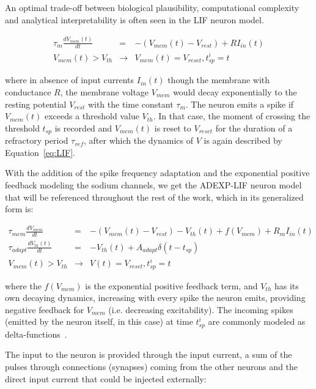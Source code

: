 An optimal trade-off between biological plausibility, computational complexity and analytical interpretability is often seen in the \ac{LIF} neuron model.

\begin{eqnarray}
    \tau_m \frac{dV_{mem}(t)}{dt} & = & - (V_{mem}(t) - V_{rest}) + RI_{in}(t) \label{eq:LIF}\\
    V_{mem}(t) > V_{th} & \rightarrow & V_{mem}(t) = V_{reset}, t^i_{sp} = t
    \label{eq:LIF_reset}
\end{eqnarray}

where in absence of input currents $I_{in}(t)$ though the membrane with conductance $R$, the membrane voltage $V_{mem}$ would decay exponentially to the resting potential $V_{rest}$ with the time constant $\tau_{m}$. The neuron emits a spike if $V_{mem}(t)$ exceeds a threshold value $V_{th}$. In that case, the moment of crossing the threshold $t_{sp}$ is recorded and $V_{mem}(t)$ is reset to $V_{reset}$ for the duration of a refractory period $\tau_{ref}$, after which the dynamics of $V$ is again described by Equation~\ref{eq:LIF}.

With the addition of the spike frequency adaptation and the exponential positive feedback modeling the sodium channels, we get the \ac{ADEXP-LIF} neuron model ~\cite{Brette_Gerstner05} that will be referenced throughout the rest of the work, which in its generalized form is:

\begin{eqnarray}
    \tau_{mem} \frac{dV_{mem}}{dt} & = & - (V_{mem}(t) - V_{rest}) - V_{th}(t) + f(V_{mem}) + R_{m}I_{in}(t)     \label{eq:AdEx}\\
    \tau_{adapt}\frac{dV_{th}(t)}{dt} & = &  -V_{th}(t) + A_{adapt} \delta(t-t_{sp}) \label{eq:LIF_adaptation}\\
    V_{mem}(t) > V_{th} & \rightarrow & V(t) = V_{reset}, t^i_{sp} = t
\end{eqnarray}

where the $f(V_{mem})$ is the exponential positive feedback term, and $V_{th}$ has its own decaying dynamics, increasing with every spike the neuron emits, providing negative feedback for $V_{mem}$ (i.e. decreasing excitability). The incoming spikes (emitted by the neuron itself, in this case) at time $t^i_{sp}$ are commonly modeled as delta-functions~\cite{Dayan_Abbott01}.

The input to the neuron is provided through the input current, a sum of the pulses through connections (synapses) coming from the other neurons and the direct input current that could be injected externally:

